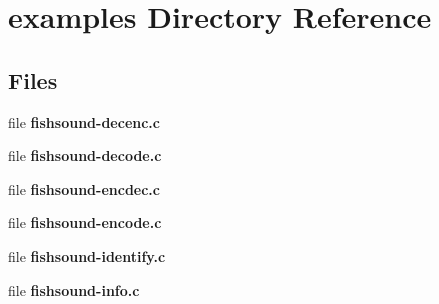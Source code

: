 \section{examples Directory Reference}
\label{dir_e931c1a3f0014e624d0645a271726ad2}
\subsection*{Files}
\begin{DoxyCompactItemize}
\item 
file {\bfseries fishsound-\/decenc.\-c}
\item 
file {\bfseries fishsound-\/decode.\-c}
\item 
file {\bfseries fishsound-\/encdec.\-c}
\item 
file {\bfseries fishsound-\/encode.\-c}
\item 
file {\bfseries fishsound-\/identify.\-c}
\item 
file {\bfseries fishsound-\/info.\-c}
\end{DoxyCompactItemize}

